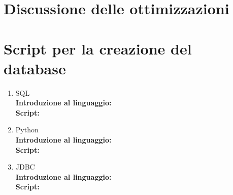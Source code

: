 \documentclass[a4paper, 10pt]{report}
\begin{document}
\chapter{Discussione delle ottimizzazioni}

\chapter{Script per la creazione del database}
\begin{enumerate}
\item SQL \\
\textbf{Introduzione al linguaggio:}\\
\textbf{Script:}\\

\item Python\\
\textbf{Introduzione al linguaggio:}\\
\textbf{Script:}\\

\item JDBC\\
\textbf{Introduzione al linguaggio:}\\
\textbf{Script:}\\
\end{enumerate}
\end{document}
